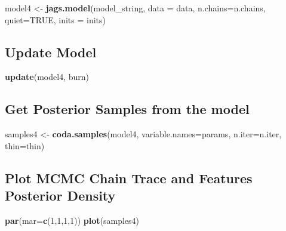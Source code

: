 \documentclass[
]{article}
\newenvironment{Shaded}{\begin{snugshade}}{\end{snugshade}}
\newcommand{\AttributeTok}[1]{\textcolor[rgb]{0.13,0.29,0.53}{#1}}
\newcommand{\ConstantTok}[1]{\textcolor[rgb]{0.56,0.35,0.01}{#1}}
\newcommand{\DecValTok}[1]{\textcolor[rgb]{0.00,0.00,0.81}{#1}}
\newcommand{\FunctionTok}[1]{\textcolor[rgb]{0.13,0.29,0.53}{\textbf{#1}}}
\newcommand{\NormalTok}[1]{#1}
\newcommand{\OtherTok}[1]{\textcolor[rgb]{0.56,0.35,0.01}{#1}}
\begin{document}
\begin{Shaded}
\begin{Highlighting}[]
\NormalTok{model4 }\OtherTok{\textless{}{-}} \FunctionTok{jags.model}\NormalTok{(model\_string, }\AttributeTok{data =}\NormalTok{ data, }\AttributeTok{n.chains=}\NormalTok{n.chains, }\AttributeTok{quiet=}\ConstantTok{TRUE}\NormalTok{, }\AttributeTok{inits =}\NormalTok{ inits)}
\end{Highlighting}
\end{Shaded}

\subsection{Update Model}\label{update-model-3}

\begin{Shaded}
\begin{Highlighting}[]
\FunctionTok{update}\NormalTok{(model4, burn)}
\end{Highlighting}
\end{Shaded}

\subsection{Get Posterior Samples from the
model}\label{get-posterior-samples-from-the-model-3}

\begin{Shaded}
\begin{Highlighting}[]
\NormalTok{samples4 }\OtherTok{\textless{}{-}} \FunctionTok{coda.samples}\NormalTok{(model4, }\AttributeTok{variable.names=}\NormalTok{params, }\AttributeTok{n.iter=}\NormalTok{n.iter, }\AttributeTok{thin=}\NormalTok{thin)}
\end{Highlighting}
\end{Shaded}

\subsection{Plot MCMC Chain Trace and Features Posterior
Density}\label{plot-mcmc-chain-trace-and-features-posterior-density-3}

\begin{Shaded}
\begin{Highlighting}[]
\FunctionTok{par}\NormalTok{(}\AttributeTok{mar=}\FunctionTok{c}\NormalTok{(}\DecValTok{1}\NormalTok{,}\DecValTok{1}\NormalTok{,}\DecValTok{1}\NormalTok{,}\DecValTok{1}\NormalTok{))}
\FunctionTok{plot}\NormalTok{(samples4)}
\end{Highlighting}
\end{Shaded}
\end{document}
